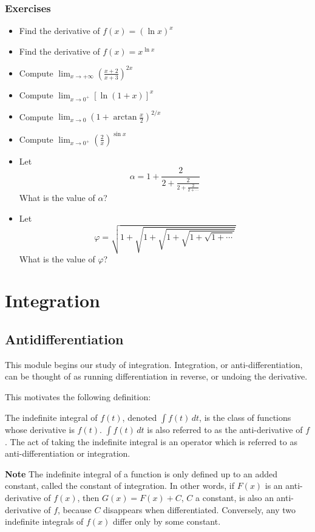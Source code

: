 \documentclass[twoside,openright,titlepage,a4paper]{book}
\begin{document}
\begin{sloppypar}
\subsection{Exercises}				
\begin{itemize}
\item Find the derivative of $f(x) = (\ln x)^x$
\item Find the derivative of $f(x) = x^{\ln x}$
\item Compute $ \displaystyle \lim_{x \to +\infty} \left( \frac{x+2}{x+3} \right)^{2x} $
\item Compute $ \displaystyle \lim_{x \to 0^+} \left[ \ln(1+x) \right]^{x} $
\item Compute $ \displaystyle \lim_{x \to 0} \left(1 + \arctan\frac{x}{2} \right)^{2/x} $
\item Compute $ \displaystyle \lim_{x \to 0^+} \left(\frac{2}{x}\right)^{\sin x} $
\item Let \[ \alpha =1 + \frac{2}{2+ \frac{2}{2+ \frac{2}{2+\cdots}}} \] What is the value of $\alpha$?
\item Let \[ \varphi = \sqrt{1+\sqrt{1+\sqrt{1+\sqrt{1+\sqrt{1+\cdots}}}}}\] What is the value of $\varphi$?
\end{itemize}

\chapter{Integration} \label{ChIntegration}
\section{Antidifferentiation} \label{ChIntegrationSecAntidifferentiation}
This module begins our study of integration. Integration, or anti-differentiation, can be thought of as running differentiation in reverse, or undoing the derivative.

This motivates the following definition:
\begin{definitionbox}[title=\textbf{The Indefinite Integral}]
The indefinite integral of $f(t)$, denoted $\int f(t)\,dt$, is the class of functions whose derivative is $f(t)$. $\int f(t)\,dt$ is also referred to as the anti-derivative of $f$. The act of taking the indefinite integral is an operator which is referred to as anti-differentiation or integration.	
\end{definitionbox}	

\textbf{Note} The indefinite integral of a function is only defined up to an added constant, called the constant of integration. In other words, if $F(x)$ is an anti-derivative of $f(x)$, then $G(x)=F(x)+C$, $C$ a constant, is also an anti-derivative of $f$, because $C$ disappears when differentiated. Conversely, any two indefinite integrals of $f(x)$ differ only by some constant.


\end{sloppypar}
\end{document}
